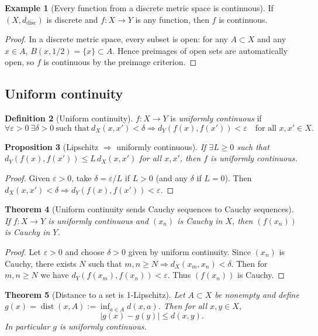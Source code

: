 \documentclass[11pt]{article}
\newtheorem{theorem}{Theorem}[section]
\newtheorem{proposition}[theorem]{Proposition}
\theoremstyle{definition}
\newtheorem{definition}[theorem]{Definition}
\newtheorem{example}[theorem]{Example}
\newcommand{\eps}{\varepsilon}
\newcommand{\dist}{\operatorname{dist}}
\begin{document}
\begin{example}[Every function from a discrete metric space is continuous]
If $(X,d_{\mathrm{disc}})$ is discrete and $f:X\to Y$ is any function, then $f$ is continuous.
\end{example}

\begin{proof}
In a discrete metric space, every subset is open: for any $A\subset X$ and any $x\in A$, $B(x,1/2)=\{x\}\subset A$.
Hence preimages of open sets are automatically open, so $f$ is continuous by the preimage criterion.
\end{proof}

\subsection{Uniform continuity}

\begin{definition}[Uniform continuity]
$f:X\to Y$ is \emph{uniformly continuous} if
\[
\forall \eps>0\ \exists \delta>0\ \text{such that}\ d_X(x,x')<\delta\Rightarrow d_Y(f(x),f(x'))<\eps
\quad\text{for all }x,x'\in X.
\]
\end{definition}

\begin{proposition}[Lipschitz $\Rightarrow$ uniformly continuous]
If $\exists L\ge 0$ such that $d_Y(f(x),f(x'))\le L\,d_X(x,x')$ for all $x,x'$, then $f$ is uniformly continuous.
\end{proposition}

\begin{proof}
Given $\eps>0$, take $\delta=\eps/L$ if $L>0$ (and any $\delta$ if $L=0$). Then $d_X(x,x')<\delta\Rightarrow d_Y(f(x),f(x'))<\eps$.
\end{proof}

\begin{theorem}[Uniform continuity sends Cauchy sequences to Cauchy sequences]
If $f:X\to Y$ is uniformly continuous and $(x_n)$ is Cauchy in $X$, then $(f(x_n))$ is Cauchy in $Y$.
\end{theorem}

\begin{proof}
Let $\eps>0$ and choose $\delta>0$ given by uniform continuity.
Since $(x_n)$ is Cauchy, there exists $N$ such that $m,n\ge N\Rightarrow d_X(x_m,x_n)<\delta$.
Then for $m,n\ge N$ we have $d_Y(f(x_m),f(x_n))<\eps$.
Thus $(f(x_n))$ is Cauchy.
\end{proof}

\begin{theorem}[Distance to a set is 1-Lipschitz]
Let $A\subset X$ be nonempty and define $g(x)=\dist(x,A):=\inf_{a\in A} d(x,a)$.
Then for all $x,y\in X$,
\[
|g(x)-g(y)|\le d(x,y).
\]
In particular $g$ is uniformly continuous.
\end{theorem}
\end{document}
